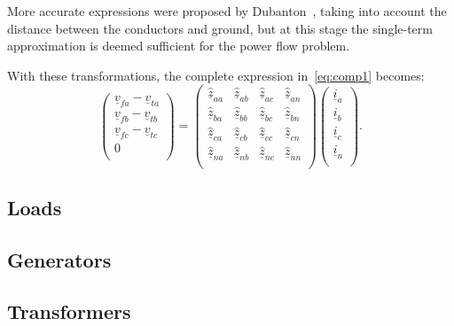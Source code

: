 \documentclass[11pt]{article}
\begin{document}
	More accurate expressions were proposed by Dubanton~\cite{dubanton1969calcul}, taking into account the distance between the conductors and ground, but at this stage the single-term approximation is deemed sufficient for the power flow problem.	

	With these transformations, the complete expression in~\eqref{eq:comp1} becomes:
	\begin{equation}
		\begin{pmatrix}
			\underline{v}_{fa} - \underline{v}_{ta} \\
			\underline{v}_{fb} - \underline{v}_{tb} \\
			\underline{v}_{fc} - \underline{v}_{tc} \\
			0 \\
		\end{pmatrix}
	= \begin{pmatrix}
		\underline{\hat{z}}_{aa} & \underline{\hat{z}}_{ab} & \underline{\hat{z}}_{ac} & \underline{\hat{z}}_{an} \\ 
		\underline{\hat{z}}_{ba} & \underline{\hat{z}}_{bb} & \underline{\hat{z}}_{bc} & \underline{\hat{z}}_{bn} \\
		\underline{\hat{z}}_{ca} & \underline{\hat{z}}_{cb} & \underline{\hat{z}}_{cc} & \underline{\hat{z}}_{cn} \\
		\underline{\hat{z}}_{na} & \underline{\hat{z}}_{nb} & \underline{\hat{z}}_{nc} & \underline{\hat{z}}_{nn} \\
	\end{pmatrix}
	\begin{pmatrix}
		\underline{i}_{a} \\
		\underline{i}_{b} \\
		\underline{i}_{c} \\
		\underline{i}_{n} \\
	\end{pmatrix}.
	\end{equation}

	


	\subsection{Loads}
	\subsection{Generators}
	\subsection{Transformers}
\end{document}
